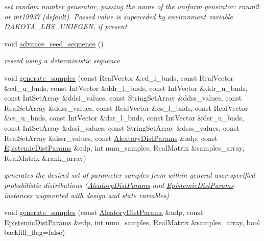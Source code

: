 \begin{DoxyCompactItemize}
\begin{DoxyCompactList}\small\item\em set random number generator, passing the name of the uniform generator\+: rnum2 or mt19937 (default). Passed value is superceded by environment variable D\+A\+K\+O\+T\+A\+\_\+\+L\+H\+S\+\_\+\+U\+N\+I\+F\+G\+EN, if present \end{DoxyCompactList}\item 
void \hyperlink{classPecos_1_1LHSDriver_a968dc84c7b328c0fde5435adfbcd4ae4}{advance\+\_\+seed\+\_\+sequence} ()
\begin{DoxyCompactList}\small\item\em reseed using a deterministic sequence \end{DoxyCompactList}\item 
void \hyperlink{classPecos_1_1LHSDriver_a89134ad076d9b362b992f1c4d6beda0b}{generate\+\_\+samples} (const Real\+Vector \&cd\+\_\+l\+\_\+bnds, const Real\+Vector \&cd\+\_\+u\+\_\+bnds, const Int\+Vector \&ddr\+\_\+l\+\_\+bnds, const Int\+Vector \&ddr\+\_\+u\+\_\+bnds, const Int\+Set\+Array \&ddsi\+\_\+values, const String\+Set\+Array \&ddss\+\_\+values, const Real\+Set\+Array \&ddsr\+\_\+values, const Real\+Vector \&cs\+\_\+l\+\_\+bnds, const Real\+Vector \&cs\+\_\+u\+\_\+bnds, const Int\+Vector \&dsr\+\_\+l\+\_\+bnds, const Int\+Vector \&dsr\+\_\+u\+\_\+bnds, const Int\+Set\+Array \&dssi\+\_\+values, const String\+Set\+Array \&dsss\+\_\+values, const Real\+Set\+Array \&dssr\+\_\+values, const \hyperlink{classPecos_1_1AleatoryDistParams}{Aleatory\+Dist\+Params} \&adp, const \hyperlink{classPecos_1_1EpistemicDistParams}{Epistemic\+Dist\+Params} \&edp, int num\+\_\+samples, Real\+Matrix \&samples\+\_\+array, Real\+Matrix \&rank\+\_\+array)
\begin{DoxyCompactList}\small\item\em generates the desired set of parameter samples from within general user-\/specified probabilistic distributions (\hyperlink{classPecos_1_1AleatoryDistParams}{Aleatory\+Dist\+Params} and \hyperlink{classPecos_1_1EpistemicDistParams}{Epistemic\+Dist\+Params} instances augmented with design and state variables) \end{DoxyCompactList}\item 
void \hyperlink{classPecos_1_1LHSDriver_ab6f579d6a8f20974b4de2b41b0256597}{generate\+\_\+samples} (const \hyperlink{classPecos_1_1AleatoryDistParams}{Aleatory\+Dist\+Params} \&adp, const \hyperlink{classPecos_1_1EpistemicDistParams}{Epistemic\+Dist\+Params} \&edp, int num\+\_\+samples, Real\+Matrix \&samples\+\_\+array, bool backfill\+\_\+flag=false)\label{classPecos_1_1LHSDriver_ab6f579d6a8f20974b4de2b41b0256597}


\end{DoxyCompactItemize}
